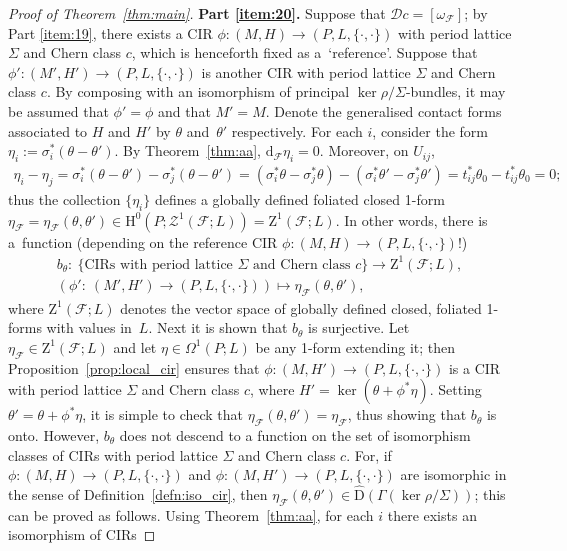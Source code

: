 \documentclass[10pt,a4paper]{amsart}
\numberwithin{equation}{section}
\newcommand{\de}{\mathrm{d}} %
\newcommand{\JM}{(P,L,\{\cdot,\cdot\})} %
\newcommand{\CM}{(M,H)} %
\newcommand{\HH}{\mathrm{H}}
\begin{document}
\begin{proof}[Proof of Theorem~\ref{thm:main}]
{\bf Part \ref{item:20}.} Suppose that $\mathcal{D}c = [\omega_{\mathcal{F}}]$; by Part \ref{item:19}, there exists a CIR $\phi \colon \CM \to \JM$ with period lattice $\Sigma$ and Chern class $c$, which is henceforth f\/ixed as a~`reference'. Suppose that $\phi'\colon (M',H') \to \JM$ is another CIR with period lattice $\Sigma$ and Chern class $c$. By composing with an isomorphism of principal $\ker \rho/\Sigma$-bundles, it may be assumed that $\phi' = \phi$ and that $M' = M$. Denote the generalised contact forms associated to $H$ and $H'$ by $\theta$ and~$\theta'$ respectively. For each $i$, consider the form $\eta_i:=\sigma^*_i\left(\theta - \theta'\right)$. By Theorem~\ref{thm:aa}, $\de_{\mathcal{F}} \eta_i = 0$. Moreover, on $U_{ij}$,
 \begin{gather*}
 \eta_i - \eta_j = \sigma^*_i (\theta - \theta' ) - \sigma^*_j(\theta - \theta')= (\sigma^*_i \theta - \sigma^*_j \theta) - (\sigma^*_i \theta' -
 \sigma^*_j \theta') = t_{ij}^* \theta_0 - t_{ij}^* \theta_0 = 0;
\end{gather*}
thus the collection $\{\eta_i\}$ def\/ines a globally def\/ined foliated closed 1-form $\eta_{\mathcal{F}} = \eta_{\mathcal{F}}(\theta,\theta')\in \HH^0(P;\mathcal{Z}^1(\mathcal{F};L)) = \mathrm{Z}^1(\mathcal{F};L)$. In other words, there is a~function (depending on the reference CIR $\phi \colon \CM \to \JM$!)
 \begin{gather*}
 b_{\theta}\colon \ \{ \text{CIRs with period lattice } \Sigma \text{ and Chern class } c\} \to \mathrm{Z}^1(\mathcal{F};L), \nonumber \\
 \left( \phi' \colon \ (M',H') \to \JM\right) \mapsto \eta_{\mathcal{F}}(\theta,\theta'),%
\end{gather*}
where $\mathrm{Z}^1(\mathcal{F};L)$ denotes the vector space of globally def\/ined closed, foliated 1-forms with values in~$L$. Next it is shown that $b_{\theta}$ is surjective. Let $\eta_{\mathcal{F}} \in \mathrm{Z}^1(\mathcal{F};L)$ and let $\eta \in \Omega^1(P;L)$ be any 1-form extending it; then Proposition~\ref{prop:local_cir} ensures that $\phi\colon (M, H') \to \JM$ is a CIR with period lattice $\Sigma$ and Chern class $c$, where $H' = \ker \left(\theta + \phi^*\eta\right)$. Setting $\theta' = \theta + \phi^* \eta$, it is simple to check that $\eta_{\mathcal{F}}(\theta,\theta') = \eta_{\mathcal{F}}$, thus showing that $b_{\theta}$ is onto. However, $b_{\theta}$ does not descend to a function on the set of isomorphism classes of CIRs with period lattice $\Sigma$ and Chern class $c$. For, if $\phi \colon \CM \to \JM$ and $\phi \colon (M,H') \to \JM$ are isomorphic in the sense of Def\/inition~\ref{defn:iso_cir}, then $\eta_{\mathcal{F}}(\theta,\theta') \in \hat{\mathrm{D}}\left(\Gamma\left( \ker \rho/\Sigma\right)\right)$; this can be proved as follows. Using Theorem~\ref{thm:aa}, for each $i$ there exists an isomorphism of CIRs

\end{proof}
\end{document}
